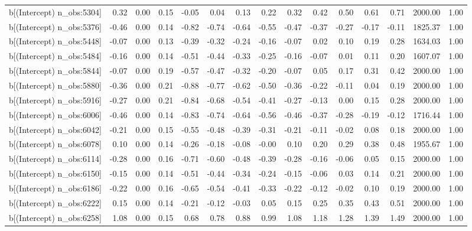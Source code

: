 \begin{table}[ht]
\begin{tabular}{rrrrrrrrrrrrrrr}
  b[(Intercept) n\_obs:5304] & 0.32 & 0.00 & 0.15 & -0.05 & 0.04 & 0.13 & 0.22 & 0.32 & 0.42 & 0.50 & 0.61 & 0.71 & 2000.00 & 1.00 \\ 
  b[(Intercept) n\_obs:5376] & -0.46 & 0.00 & 0.14 & -0.82 & -0.74 & -0.64 & -0.55 & -0.47 & -0.37 & -0.27 & -0.17 & -0.11 & 1825.37 & 1.00 \\ 
  b[(Intercept) n\_obs:5448] & -0.07 & 0.00 & 0.13 & -0.39 & -0.32 & -0.24 & -0.16 & -0.07 & 0.02 & 0.10 & 0.19 & 0.28 & 1634.03 & 1.00 \\ 
  b[(Intercept) n\_obs:5484] & -0.16 & 0.00 & 0.14 & -0.51 & -0.44 & -0.33 & -0.25 & -0.16 & -0.07 & 0.01 & 0.11 & 0.20 & 1607.07 & 1.00 \\ 
  b[(Intercept) n\_obs:5844] & -0.07 & 0.00 & 0.19 & -0.57 & -0.47 & -0.32 & -0.20 & -0.07 & 0.05 & 0.17 & 0.31 & 0.42 & 2000.00 & 1.00 \\ 
  b[(Intercept) n\_obs:5880] & -0.36 & 0.00 & 0.21 & -0.88 & -0.77 & -0.62 & -0.50 & -0.36 & -0.22 & -0.11 & 0.04 & 0.19 & 2000.00 & 1.00 \\ 
  b[(Intercept) n\_obs:5916] & -0.27 & 0.00 & 0.21 & -0.84 & -0.68 & -0.54 & -0.41 & -0.27 & -0.13 & 0.00 & 0.15 & 0.28 & 2000.00 & 1.00 \\ 
  b[(Intercept) n\_obs:6006] & -0.46 & 0.00 & 0.14 & -0.83 & -0.74 & -0.64 & -0.56 & -0.46 & -0.37 & -0.28 & -0.19 & -0.12 & 1716.44 & 1.00 \\ 
  b[(Intercept) n\_obs:6042] & -0.21 & 0.00 & 0.15 & -0.55 & -0.48 & -0.39 & -0.31 & -0.21 & -0.11 & -0.02 & 0.08 & 0.18 & 2000.00 & 1.00 \\ 
  b[(Intercept) n\_obs:6078] & 0.10 & 0.00 & 0.14 & -0.26 & -0.18 & -0.08 & -0.00 & 0.10 & 0.20 & 0.29 & 0.38 & 0.48 & 1955.67 & 1.00 \\ 
  b[(Intercept) n\_obs:6114] & -0.28 & 0.00 & 0.16 & -0.71 & -0.60 & -0.48 & -0.39 & -0.28 & -0.16 & -0.06 & 0.05 & 0.15 & 2000.00 & 1.00 \\ 
  b[(Intercept) n\_obs:6150] & -0.15 & 0.00 & 0.14 & -0.51 & -0.44 & -0.34 & -0.24 & -0.15 & -0.06 & 0.03 & 0.14 & 0.21 & 2000.00 & 1.00 \\ 
  b[(Intercept) n\_obs:6186] & -0.22 & 0.00 & 0.16 & -0.65 & -0.54 & -0.41 & -0.33 & -0.22 & -0.12 & -0.02 & 0.10 & 0.19 & 2000.00 & 1.00 \\ 
  b[(Intercept) n\_obs:6222] & 0.15 & 0.00 & 0.14 & -0.21 & -0.12 & -0.03 & 0.05 & 0.15 & 0.25 & 0.35 & 0.43 & 0.51 & 2000.00 & 1.00 \\ 
  b[(Intercept) n\_obs:6258] & 1.08 & 0.00 & 0.15 & 0.68 & 0.78 & 0.88 & 0.99 & 1.08 & 1.18 & 1.28 & 1.39 & 1.49 & 2000.00 & 1.00 \\ 

\end{tabular}
\end{table}
